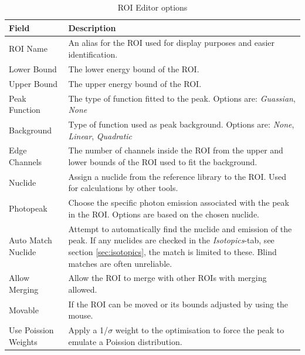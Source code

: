 \begin{table}[H]
    \centering
    \caption{ROI Editor options}
    \label{tab:ROI_editor}
    \begin{tabular}{p{}p{}}
    \toprule
    \textbf{Field} & \textbf{Description} \\ \midrule
    ROI Name & An alias for the ROI used for display purposes and easier identification. \\
    Lower Bound & The lower energy bound of the ROI. \\
    Upper Bound & The upper energy bound of the ROI. \\
    Peak Function & The type of function fitted to the peak. Options are: \textit{Guassian}, \textit{None} \\
    Background & Type of function used as peak background. Options are: \textit{None}, \textit{Linear}, \textit{Quadratic} \\
    Edge Channels & The number of channels inside the ROI from the upper and lower bounds of the ROI used to fit the background. \\
    Nuclide & Assign a nuclide from the reference library to the ROI. Used for calculations by other tools. \\
    Photopeak & Choose the specific photon emission associated with the peak in the ROI. Options are based on the chosen nuclide. \\
    Auto Match Nuclide & Attempt to automatically find the nuclide and emission of the peak. If any nuclides are checked in the \textit{Isotopics}-tab, see section \ref{sec:isotopics}, the match is limited to these. Blind matches are often unreliable. \\
    Allow Merging & Allow the ROI to merge with other ROIs with merging allowed. \\
    Movable & If the ROI can be moved or its bounds adjusted by using the mouse. \\
    Use Poission Weights & Apply a 1/$\sigma$ weight to the optimisation to force the peak to emulate a Poission distribution. \\
    \bottomrule

    \end{tabular}
\end{table}


